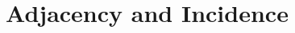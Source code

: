 \documentclass{report}
\begin{document}
    \pagebreak \bigbreak \noindent 
    \section{\LARGE Adjacency and Incidence}
    \smallbreak \noindent
    \begin{definition}
    \textbf{} 
    \end{definition}
    
    
    
    
    
    

     
\end{document}
